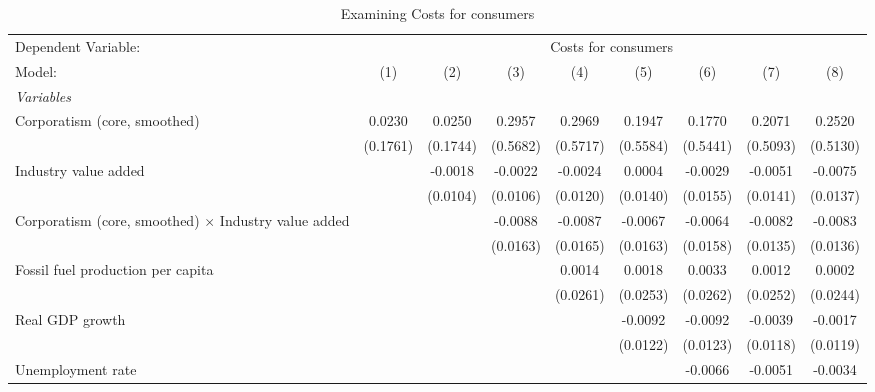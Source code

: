 
\begin{table}[htbp]
   \caption{Examining Costs for consumers}
   \centering
   \begin{tabular}{lcccccccc}
      \tabularnewline \midrule \midrule
      Dependent Variable: & \multicolumn{8}{c}{Costs for consumers}\\
      Model:                                                      & (1)      & (2)      & (3)      & (4)      & (5)      & (6)      & (7)      & (8)\\  
      \midrule
      \emph{Variables}\\
      Corporatism (core, smoothed)                                & 0.0230   & 0.0250   & 0.2957   & 0.2969   & 0.1947   & 0.1770   & 0.2071   & 0.2520\\   
                                                                  & (0.1761) & (0.1744) & (0.5682) & (0.5717) & (0.5584) & (0.5441) & (0.5093) & (0.5130)\\   
      Industry value added                                        &          & -0.0018  & -0.0022  & -0.0024  & 0.0004   & -0.0029  & -0.0051  & -0.0075\\   
                                                                  &          & (0.0104) & (0.0106) & (0.0120) & (0.0140) & (0.0155) & (0.0141) & (0.0137)\\   
      Corporatism (core, smoothed) $\times$ Industry value added  &          &          & -0.0088  & -0.0087  & -0.0067  & -0.0064  & -0.0082  & -0.0083\\   
                                                                  &          &          & (0.0163) & (0.0165) & (0.0163) & (0.0158) & (0.0135) & (0.0136)\\   
      Fossil fuel production per capita                           &          &          &          & 0.0014   & 0.0018   & 0.0033   & 0.0012   & 0.0002\\   
                                                                  &          &          &          & (0.0261) & (0.0253) & (0.0262) & (0.0252) & (0.0244)\\   
      Real GDP growth                                             &          &          &          &          & -0.0092  & -0.0092  & -0.0039  & -0.0017\\   
                                                                  &          &          &          &          & (0.0122) & (0.0123) & (0.0118) & (0.0119)\\   
      Unemployment rate                                           &          &          &          &          &          & -0.0066  & -0.0051  & -0.0034\\   

\end{tabular}
\end{table}
